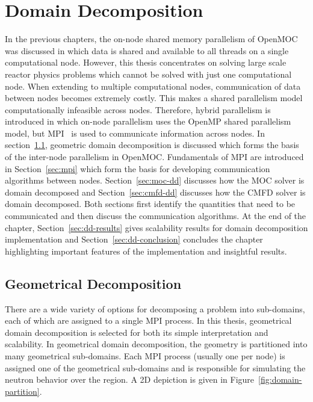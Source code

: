 \chapter{Domain Decomposition}
\label{chap:domain-decomposition}

In the previous chapters, the on-node shared memory parallelism of OpenMOC was discussed in which data is shared and available to all threads on a single computational node. However, this thesis concentrates on solving large scale reactor physics problems which cannot be solved with just one computational node. When extending to multiple computational nodes, communication of data between nodes becomes extremely costly. This makes a shared parallelism model computationally infeasible across nodes. Therefore, hybrid parallelism is introduced in which on-node parallelism uses the OpenMP shared parallelism model, but \ac{MPI}~\cite{mpi} is used to communicate information across nodes. In section~\ref{sec:geometrical-decomposition}, geometric domain decomposition is discussed which forms the basis of the inter-node parallelism in OpenMOC. Fundamentals of \ac{MPI} are introduced in Section~\ref{sec:mpi} which form the basis for developing communication algorithms between nodes. Section~\ref{sec:moc-dd} discusses how the \ac{MOC} solver is domain decomposed and Section~\ref{sec:cmfd-dd} discusses how the \ac{CMFD} solver is domain decomposed. Both sections first identify the quantities that need to be communicated and then discuss the communication algorithms. At the end of the chapter, Section~\ref{sec:dd-results} gives scalability results for domain decomposition implementation and Section~\ref{sec:dd-conclusion} concludes the chapter highlighting important features of the implementation and insightful results.

\section{Geometrical Decomposition}
\label{sec:geometrical-decomposition}

There are a wide variety of options for decomposing a problem into sub-domains, each of which are assigned to a single \ac{MPI} process. In this thesis, geometrical domain decomposition is selected for both its simple interpretation and scalability. In geometrical domain decomposition, the geometry is partitioned into many geometrical sub-domains. Each \ac{MPI} process (usually one per node) is assigned one of the geometrical sub-domains and is responsible for simulating the neutron behavior over the region. A 2D depiction is given in Figure~\ref{fig:domain-partition}.

